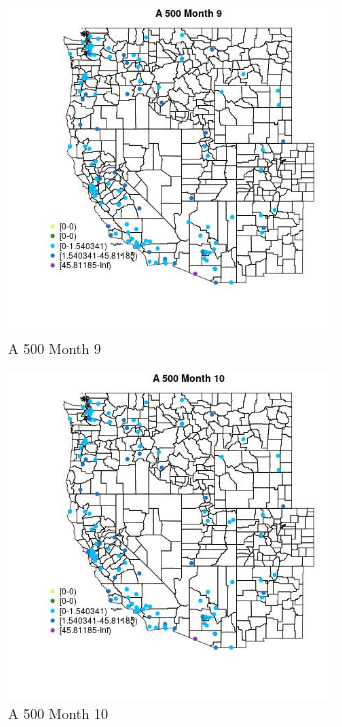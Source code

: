 \begin{figure} 
\centering  
\includegraphics[width=0.77\textwidth]{Code_Outputs/Report_ML_input_PM25_Step4_part_e_de_duplicated_aves_MapObsMo9A_500.jpg} 
\caption{\label{fig:Report_ML_input_PM25_Step4_part_e_de_duplicated_avesMapObsMo9A_500}A 500 Month 9} 
\end{figure} 
 

\begin{figure} 
\centering  
\includegraphics[width=0.77\textwidth]{Code_Outputs/Report_ML_input_PM25_Step4_part_e_de_duplicated_aves_MapObsMo10A_500.jpg} 
\caption{\label{fig:Report_ML_input_PM25_Step4_part_e_de_duplicated_avesMapObsMo10A_500}A 500 Month 10} 
\end{figure} 
 

